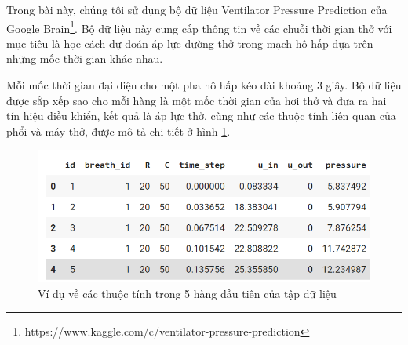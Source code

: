 \documentclass{article}
\begin{document}
%    
 
Trong bài này, chúng tôi sử dụng bộ dữ liệu Ventilator Pressure Prediction của Google Brain\footnote{https://www.kaggle.com/c/ventilator-pressure-prediction}. Bộ dữ liệu này cung cấp thông tin về các chuỗi thời gian thở với mục tiêu là học cách dự đoán áp lực đường thở trong mạch hô hấp dựa trên những mốc thời gian khác nhau. 


Mỗi mốc thời gian đại diện cho một pha hô hấp kéo dài khoảng 3 giây. Bộ dữ liệu được sắp xếp sao cho mỗi hàng là một mốc thời gian của hơi thở và đưa ra hai tín hiệu điều khiển, kết quả là áp lực thở, cũng như các thuộc tính liên quan của phổi và máy thở, được mô tả chi tiết ở hình \ref{fig:mesh1}.\\

\begin{figure}[!h]
    \centering
    \includegraphics[scale=0.4]{1.png}
    \caption{Ví dụ về các thuộc tính trong 5 hàng đầu tiên của tập dữ liệu}
    \label{fig:mesh1}
\end{figure}
 
\end{document}
